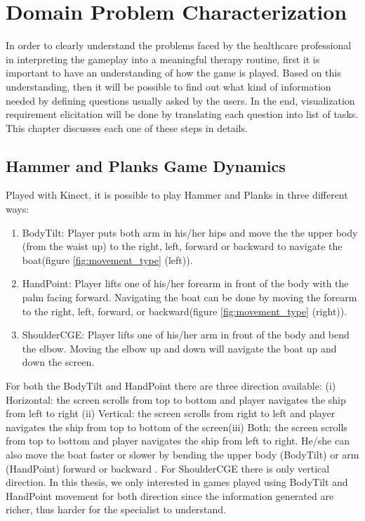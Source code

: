 \chapter{Domain Problem Characterization}
\label{chap:problem}

In order to clearly understand the problems faced by the healthcare professional in interpreting the gameplay into a meaningful therapy routine, first it is important to have an understanding of how the game is played. Based on this understanding, then it will be possible to find out what kind of information needed by defining questions usually asked by the users. In the end, visualization requirement elicitation will be done by translating each question into list of tasks. This chapter discusses each one of these steps in details.

\section{Hammer and Planks Game Dynamics}

Played with Kinect, it is possible to play Hammer and Planks in three different ways:
\begin{enumerate}
  \item BodyTilt:
  Player puts both arm in his/her hips and move the the upper body (from the waist up) to the right, left, forward or backward to navigate the boat(figure \ref{fig:movement_type} (left)). 
  \item HandPoint:
  Player lifts one of his/her forearm in front of the body with the palm facing forward. Navigating the boat can be done by moving the forearm to the right, left, forward, or backward(figure \ref{fig:movement_type} (right)).
  \item ShoulderCGE:
  Player lifts one of his/her arm in front of the body and bend the elbow. Moving the elbow up and down will navigate the boat up and down the screen.
\end{enumerate}

For both the BodyTilt and HandPoint there are three direction available: (i) Horizontal: the screen scrolls from top to bottom and player navigates the ship from left to right (ii) Vertical: the screen scrolls from right to left and player navigates the ship from top to bottom of the screen(iii) Both: the screen scrolls from top to bottom and player navigates the ship from left to right. He/she can also move the boat faster or slower by bending the upper body (BodyTilt) or arm (HandPoint) forward or backward . For ShoulderCGE there is only vertical direction. In this thesis, we only interested in games played using BodyTilt and HandPoint movement for both direction since the information generated are richer, thus harder for the specialist to understand.

